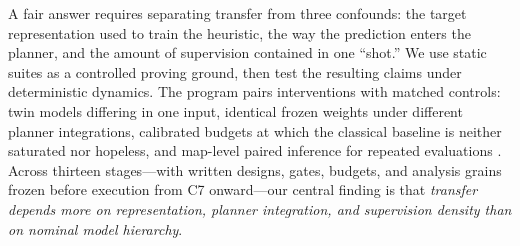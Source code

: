 \documentclass[letterpaper]{article} %
\newcommand{\stage}[1]{\textsc{#1}}
\begin{document}
A fair answer requires separating transfer from three confounds: the target representation used to train the heuristic, the way the prediction enters the planner, and the amount of supervision contained in one ``shot.'' We use static suites as a controlled proving ground, then test the resulting claims under deterministic dynamics. The program pairs interventions with matched controls: twin models differing in one input, identical frozen weights under different planner integrations, calibrated budgets at which the classical baseline is neither saturated nor hopeless, and map-level paired inference for repeated evaluations \citep{henderson2018matters,agarwal2021precipice,pineau2021reproducibility}. Across thirteen stages---with written designs, gates, budgets, and analysis grains frozen before execution from \stage{C7} onward---our central finding is that \emph{transfer depends more on representation, planner integration, and supervision density than on nominal model hierarchy}.
\end{document}
